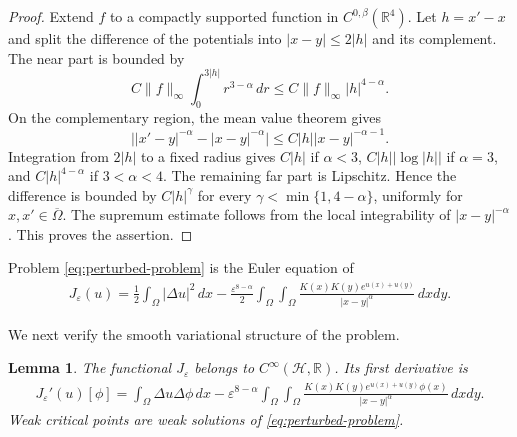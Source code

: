 \documentclass[11pt]{article}
\newtheorem{lemma}[theorem]{Lemma}
\numberwithin{equation}{section}
\begin{document}
\begin{proof}
Extend $f$ to a compactly supported function in
$C^{0,\beta}(\mathbb R^4)$. Let $h=x'-x$ and split the difference of the
potentials into $|x-y|\leq2|h|$ and its complement. The near part is
bounded by
\[
C\|f\|_\infty\int_0^{3|h|}r^{3-\alpha}\,dr
\leq C\|f\|_\infty |h|^{4-\alpha}.
\]
On the complementary region, the mean value theorem gives
\[
\bigl||x'-y|^{-\alpha}-|x-y|^{-\alpha}\bigr|
\leq C|h||x-y|^{-\alpha-1}.
\]
Integration from $2|h|$ to a fixed radius gives $C|h|$ if
$\alpha<3$, $C|h||\log|h||$ if $\alpha=3$, and
$C|h|^{4-\alpha}$ if $3<\alpha<4$. The remaining far part is
Lipschitz. Hence the difference is bounded by $C|h|^\gamma$ for every
$\gamma<\min\{1,4-\alpha\}$, uniformly for $x,x'\in\overline\Omega$.
The supremum estimate follows from the local integrability of
$|x-y|^{-\alpha}$. This proves the assertion.
\end{proof}

Problem \eqref{eq:perturbed-problem} is the Euler equation of
\begin{equation*}
\begin{aligned}
J_\varepsilon(u)
={}\frac12\int_\Omega|\Delta u|^2\,dx-\frac{\varepsilon^{8-\alpha}}2
\int_\Omega\int_\Omega
\frac{K(x)K(y)e^{u(x)+u(y)}}{|x-y|^\alpha}\,dxdy.
\end{aligned}
\end{equation*}

We next verify the smooth variational structure of the problem.

\begin{lemma}
The functional $J_\varepsilon$ belongs to $C^\infty(\mathcal H,\mathbb R)$.
Its first derivative is
\begin{equation}\label{eq:first-variation}
\begin{aligned}
J_\varepsilon'(u)[\phi]
={}\int_\Omega\Delta u\Delta\phi\,dx-\varepsilon^{8-\alpha}
\int_\Omega\int_\Omega
\frac{K(x)K(y)e^{u(x)+u(y)}\phi(x)}{|x-y|^\alpha}\,dxdy.
\end{aligned}
\end{equation}
Weak critical points are weak solutions of
\eqref{eq:perturbed-problem}.
\end{lemma}
\end{document}
